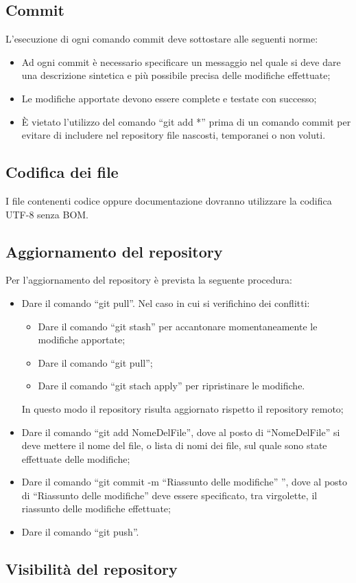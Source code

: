 \documentclass[../NormeProgetto.tex]{subfiles}
\begin{document}
	\subsection{Commit}
	L'esecuzione di ogni comando commit deve sottostare alle seguenti norme:
	\begin{itemize}
		\item Ad ogni commit è necessario specificare un messaggio nel quale si deve dare una descrizione sintetica e più possibile precisa delle modifiche effettuate;
		\item Le modifiche apportate devono essere complete e testate con successo;
		\item È vietato l'utilizzo del comando ``git add *'' prima di un comando commit per evitare di includere nel repository file nascosti, temporanei o non voluti.
	\end{itemize}
	\subsection{Codifica dei file}
	I file contenenti codice oppure documentazione dovranno utilizzare la codifica UTF-8 senza BOM.
	\subsection{Aggiornamento del repository}
	Per l'aggiornamento del repository è prevista la seguente procedura:
	\begin{itemize}
		\item Dare il comando ``git pull''. Nel caso in cui si verifichino dei conflitti:
			\begin{itemize}
			\item Dare il comando ``git stash'' per accantonare momentaneamente le modifiche apportate;
			\item Dare il comando ``git pull'';
			\item Dare il comando ``git stach apply'' per ripristinare le modifiche.
			\end{itemize}
		In questo modo il repository risulta aggiornato rispetto il repository remoto;
		\item Dare il comando ``git add NomeDelFile'', dove al posto di ``NomeDelFile'' si deve mettere il nome del file, o lista di nomi dei file, sul quale sono state effettuate delle modifiche;
		\item Dare il comando ``git commit -m ``Riassunto delle modifiche'' '', dove al posto di ``Riassunto delle modifiche'' deve essere specificato, tra virgolette, il riassunto delle modifiche effettuate;
		\item Dare il comando ``git push''.
	\end{itemize}
\subsection{Visibilità del repository}
\end{document}
